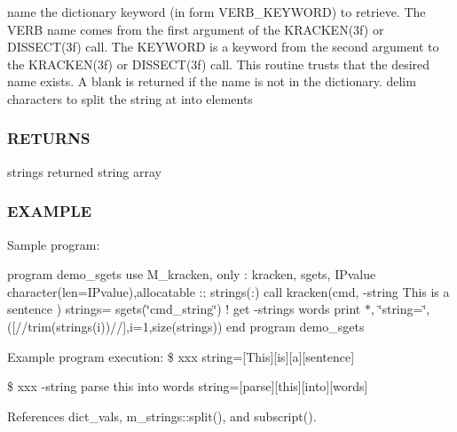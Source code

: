 name the dictionary keyword (in form V\+E\+R\+B\+\_\+\+K\+E\+Y\+W\+O\+RD) to retrieve. The V\+E\+RB name comes from the first argument of the K\+R\+A\+C\+K\+E\+N(3f) or D\+I\+S\+S\+E\+C\+T(3f) call. The K\+E\+Y\+W\+O\+RD is a keyword from the second argument to the K\+R\+A\+C\+K\+E\+N(3f) or D\+I\+S\+S\+E\+C\+T(3f) call. This routine trusts that the desired name exists. A blank is returned if the name is not in the dictionary. delim characters to split the string at into elements

\subsubsection*{R\+E\+T\+U\+R\+NS}

strings returned string array

\subsubsection*{E\+X\+A\+M\+P\+LE}

Sample program\+:

program demo\+\_\+sgets use M\+\_\+kracken, only \+: kracken, sgets, I\+Pvalue character(len=I\+Pvalue),allocatable \+:\+: strings(\+:) call kracken(\textquotesingle{}cmd\textquotesingle{},\textquotesingle{} -\/string This is a sentence \textquotesingle{}) strings= sgets(\char`\"{}cmd\+\_\+string\char`\"{}) ! get -\/strings words print $\ast$, \char`\"{}string=\char`\"{},(\textquotesingle{}\mbox{[}\textquotesingle{}//trim(strings(i))//\textquotesingle{}\mbox{]}\textquotesingle{},i=1,size(strings)) end program demo\+\_\+sgets

Example program execution\+: \$ xxx string=\mbox{[}This\mbox{]}\mbox{[}is\mbox{]}\mbox{[}a\mbox{]}\mbox{[}sentence\mbox{]}

\$ xxx -\/string parse this into words string=\mbox{[}parse\mbox{]}\mbox{[}this\mbox{]}\mbox{[}into\mbox{]}\mbox{[}words\mbox{]} 

References dict\+\_\+vals, m\+\_\+strings\+::split(), and subscript().

